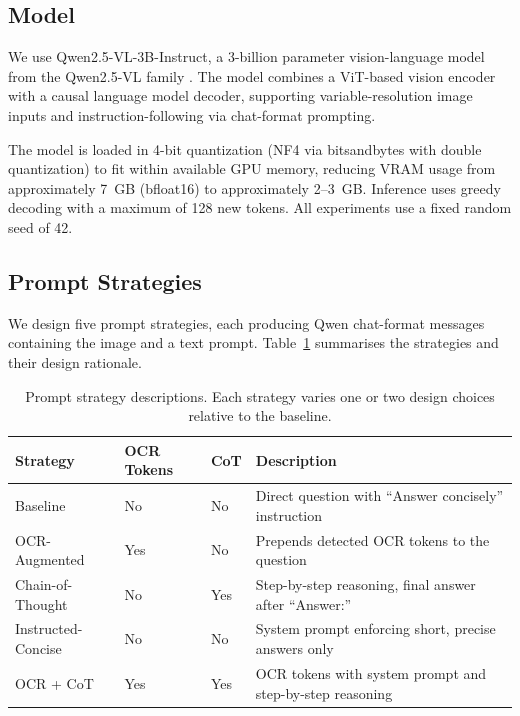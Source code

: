 \documentclass[11pt]{article}
\begin{document}
\subsection{Model}

We use Qwen2.5-VL-3B-Instruct, a 3-billion parameter vision-language model from the Qwen2.5-VL family \citep{bai2023qwenvl}. The model combines a ViT-based vision encoder with a causal language model decoder, supporting variable-resolution image inputs and instruction-following via chat-format prompting.

The model is loaded in 4-bit quantization (NF4 via bitsandbytes with double quantization) to fit within available GPU memory, reducing VRAM usage from approximately 7~GB (bfloat16) to approximately 2--3~GB. Inference uses greedy decoding with a maximum of 128 new tokens. All experiments use a fixed random seed of 42.

\subsection{Prompt Strategies}

We design five prompt strategies, each producing Qwen chat-format messages containing the image and a text prompt. Table~\ref{tab:strategies} summarises the strategies and their design rationale.

\begin{table}[H]
\centering
\caption{Prompt strategy descriptions. Each strategy varies one or two design choices relative to the baseline.}
\label{tab:strategies}
\small
\begin{tabular}{p{3.2cm}p{2.2cm}p{1.5cm}p{5.5cm}}
\toprule
\textbf{Strategy} & \textbf{OCR Tokens} & \textbf{CoT} & \textbf{Description} \\
\midrule
Baseline           & No  & No  & Direct question with ``Answer concisely'' instruction \\
OCR-Augmented      & Yes & No  & Prepends detected OCR tokens to the question \\
Chain-of-Thought   & No  & Yes & Step-by-step reasoning, final answer after ``Answer:'' \\
Instructed-Concise & No  & No  & System prompt enforcing short, precise answers only \\
OCR + CoT          & Yes & Yes & OCR tokens with system prompt and step-by-step reasoning \\
\bottomrule
\end{tabular}
\end{table}
\end{document}
